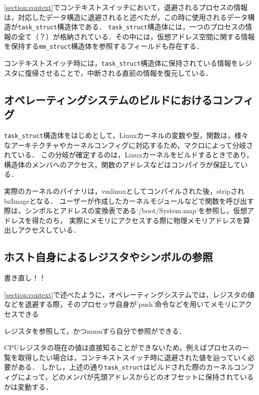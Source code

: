 \ref{section:context}でコンテキストスイッチにおいて，退避されるプロセスの情報は，対応したデータ構造に退避されると述べたが，この時に使用されるデータ構造が\verb|task_struct|構造体である．
\verb|task_struct|構造体には，一つのプロセスの情報の全て（？）が格納されている．その中には，仮想アドレス空間に関する情報を保持する\verb|mm_struct|構造体を参照するフィールドも存在する．

コンテキストスイッチ時には，\verb|task_struct|構造体に保持されている情報をレジスタに復帰させることで，中断される直前の情報を復元している．

\subsection{オペレーティングシステムのビルドにおけるコンフィグ}

\verb|task_struct|構造体をはじめとして，Linuxカーネルの変数や型，関数は，様々なアーキテクチャやカーネルコンフィグに対応するため，マクロによって分岐されている．
この分岐が確定するのは，Linuxカーネルをビルドするときであり，構造体のメンバへのアクセス，関数のアドレスなどはコンパイラが保証している．

実際のカーネルのバイナリは，vmlinuxとしてコンパイルされた後，stripされbzImageとなる．
ユーザーが作成したカーネルモジュールなどで関数を呼び出す際は，シンボルとアドレスの変換表である`/boot/System.map`を参照し，仮想アドレスを得たのち，
実際にメモリにアクセスする際に物理メモリアドレスを算出しアクセスしている．

\subsection{ホスト自身によるレジスタやシンボルの参照}

書き直し！！

\ref{section:context}で述べたように，オペレーティングシステムでは，レジスタの値などを退避する際，そのプロセッサ自身が'push'命令などを用いてメモリにアクセスできる

レジスタを参照して，かつmmuすら自分で参照ができる．

CPUレジスタの現在の値は直接知ることができないため，例えばプロセスの一覧を取得したい場合は，コンテキストスイッチ時に退避された値を辿っていく必要がある．
しかし，上述の通り\verb|task_struct|はビルドされた際のカーネルコンフィグによって，どのメンバが先頭アドレスからどのオフセットに保持されているかは変動する．

